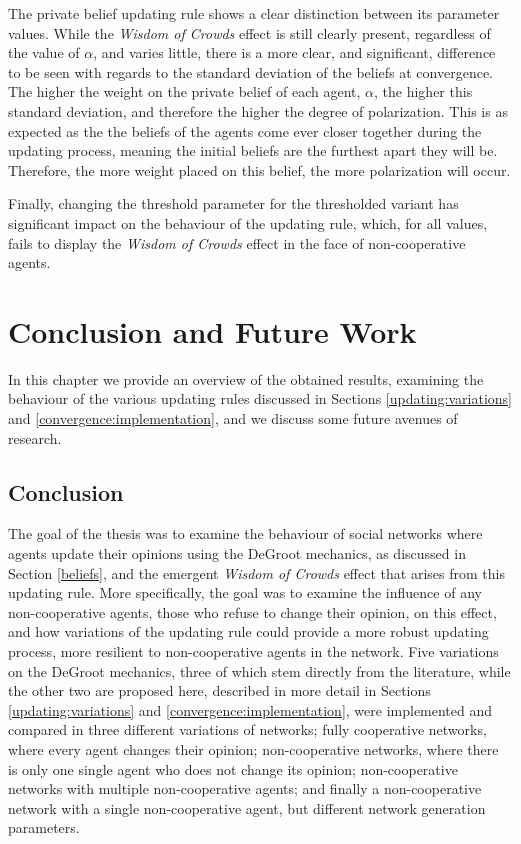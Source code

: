 \documentclass[a4paper, 12pt]{report}
\begin{document}
The private belief updating rule shows a clear distinction between its parameter values. While the \emph{Wisdom of Crowds} effect is still clearly present, regardless of the value of $\alpha$, and varies little, there is a more clear, and significant, difference to be seen with regards to the standard deviation of the beliefs at convergence. The higher the weight on the private belief of each agent, $\alpha$, the higher this standard deviation, and therefore the higher the degree of polarization. This is as expected as the the beliefs of the agents come ever closer together during the updating process, meaning the initial beliefs are the furthest apart they will be. Therefore, the more weight placed on this belief, the more polarization will occur.

Finally, changing the threshold parameter for the thresholded variant has significant impact on the behaviour of the updating rule, which, for all values, fails to display the \emph{Wisdom of Crowds} effect in the face of non-cooperative agents.

\newpage



\chapter{Conclusion and Future Work}
\label{chapter:conclusion}
In this chapter we provide an overview of the obtained results, examining the behaviour of the various updating rules discussed in Sections \ref{updating:variations} and \ref{convergence:implementation}, and we discuss some future avenues of research.

\section{Conclusion}

The goal of the thesis was to examine the behaviour of social networks where agents update their opinions using the DeGroot mechanics, as discussed in Section \ref{beliefs}, and the emergent \emph{Wisdom of Crowds} effect that arises from this updating rule. More specifically, the goal was to examine the influence of any non-cooperative agents, those who refuse to change their opinion, on this effect, and how variations of the updating rule could provide a more robust updating process, more resilient to non-cooperative agents in the network. Five variations on the DeGroot mechanics, three of which stem directly from the literature, while the other two are proposed here, described in more detail in Sections \ref{updating:variations} and \ref{convergence:implementation}, were implemented and compared in three different variations of networks; fully cooperative networks, where every agent changes their opinion; non-cooperative networks, where there is only one single agent who does not change its opinion; non-cooperative networks with multiple non-cooperative agents; and finally a non-cooperative network with a single non-cooperative agent, but different network generation parameters.
\end{document}
